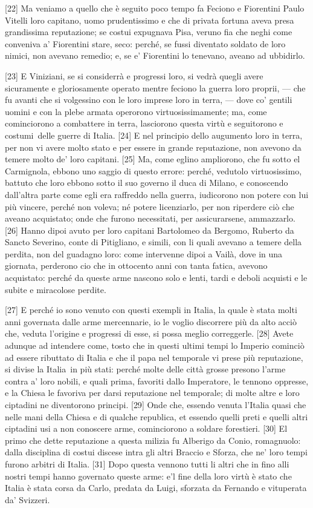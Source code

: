 {[}22{]} Ma veniamo a quello che è seguito poco tempo fa Feciono e
Fiorentini Paulo Vitelli loro capitano, uomo prudentissimo e che di
privata fortuna aveva presa grandissima reputazione; se costui expugnava
Pisa, veruno fia che neghi come conveniva a' Fiorentini stare, seco:
perché, se fussi diventato soldato de loro nimici, non avevano remedio;
e, se e' Fiorentini lo tenevano, aveano ad ubbidirlo.

{[}23{]} E Viniziani, se si considerrà e progressi loro, si vedrà quegli
avere sicuramente e gloriosamente operato mentre feciono la guerra loro
proprii, --- che fu avanti che si volgessino con le loro imprese loro in
terra, --- dove co' gentili uomini e con la plebe armata operorono
virtuosissimamente; ma, come cominciorono a combattere in terra,
lasciorono questa virtù e seguitorono e costumi\est\ delle guerre di Italia.
{[}24{]} E nel principio dello augumento loro in terra, per non vi avere
molto stato e per essere in grande reputazione, non avevono da temere
molto de' loro capitani. {[}25{]} Ma, come eglino ampliorono, che fu
sotto el Carmignola, ebbono uno saggio di questo errore: perché,
vedutolo virtuosissimo, battuto che loro ebbono sotto il suo governo il
duca di Milano, e conoscendo dall'altra parte come egli era raffreddo
nella guerra, iudicorono non potere con lui più vincere, perché non
voleva; né potere licenziarlo, per non riperdere ciò che aveano
acquistato; onde che furono necessitati, per assicurarsene, ammazzarlo.
{[}26{]} Hanno dipoi avuto per loro capitani Bartolomeo da Bergomo,
Ruberto da Sancto Severino, conte di Pitigliano, e simili, con li quali
avevano a temere della perdita, non del guadagno loro: come intervenne
dipoi a Vailà, dove in una giornata, perderono cio che in ottocento anni
con tanta fatica, avevono acquistato: perché da queste arme nascono solo
e lenti, tardi e deboli acquisti e le subite e miracolose perdite.

{[}27{]} E perché io sono venuto con questi exempli in Italia, la quale
è stata molti anni governata dalle arme mercennarie, io le voglio
discorrere più da alto acciò che, veduta l'origine e progressi di esse,
si possa meglio correggerle. {[}28{]} Avete adunque ad intendere come,
tosto che in questi ultimi tempi lo Imperio cominciò ad essere ributtato
di Italia e che il papa nel temporale vi prese più reputazione, si
divise la Italia\est\ in più stati: perché molte delle città grosse presono l'arme contra a' loro nobili, e quali prima, favoriti dallo Imperatore,
le tennono oppresse, e la Chiesa le favoriva per darsi reputazione nel
temporale; di molte altre e loro ciptadini ne diventorono principi.
{[}29{]} Onde che, essendo venuta l'Italia quasi che nelle mani della
Chiesa e di qualche republica, et essendo quelli preti e quelli altri
ciptadini usi a non conoscere arme, cominciorono a soldare forestieri.
{[}30{]} El primo che dette reputazione a questa milizia fu Alberigo da
Conio, romagnuolo: dalla disciplina di costui discese intra gli altri
Braccio e Sforza, che ne' loro tempi furono arbitri di Italia. {[}31{]}
Dopo questa vennono tutti li altri che in fino alli nostri tempi hanno
governato queste arme: e'l fine della loro virtù è stato che Italia è
stata corsa da Carlo, predata da Luigi, sforzata da Fernando e
vituperata da' Svizzeri.

